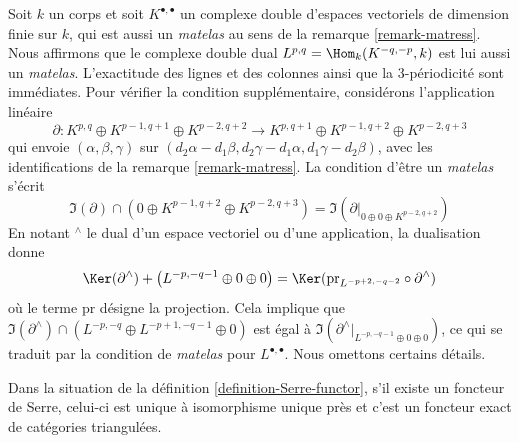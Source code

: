 \begin{remark}
\label{remark-dual-matress}
Soit $k$ un corps et soit $K^{\bullet, \bullet}$ un complexe double
d'espaces vectoriels de dimension finie sur $k$, qui est aussi un {\it matelas} au sens de la
remarque \ref{remark-matress}. Nous affirmons que le complexe double dual
$L^{p, q} = \Hom_k(K^{-q, -p}, k)$ est lui aussi un {\it matelas}. L'exactitude des
lignes et des colonnes ainsi que la 3-périodicité sont immédiates. Pour vérifier
la condition supplémentaire, considérons l'application linéaire
$$
\partial :
K^{p, q} \oplus K^{p - 1, q + 1} \oplus K^{p - 2, q + 2}
\longrightarrow
K^{p, q + 1} \oplus K^{p - 1, q + 2} \oplus K^{p - 2, q + 3}
$$
qui envoie $(\alpha, \beta, \gamma)$ sur
$(d_2 \alpha - d_1 \beta, d_2 \gamma - d_1 \alpha, d_1 \gamma - d_2 \beta)$,
avec les identifications de la remarque \ref{remark-matress}.
La condition d'être un {\it matelas} s'écrit
$$
\Im(\partial) \cap
\left( 0 \oplus K^{p - 1, q + 2} \oplus K^{p - 2, q + 3} \right)
=
\Im(\partial|_{0 \oplus 0 \oplus K^{p - 2, q + 2}})
$$
En notant ${}^\wedge$ le dual d'un espace vectoriel ou d'une application, la dualisation
donne
$$
\Ker(\partial^\wedge) +
\left(L^{-p, -q - 1} \oplus 0 \oplus 0 \right)
=
\Ker(\text{pr}_{L^{-p + 2, -q - 2}} \circ \partial^\wedge)
$$
où le terme $\text{pr}$ désigne la projection. Cela implique
que
$\Im(\partial^\wedge) \cap (L^{-p, -q} \oplus L^{-p + 1, -q - 1} \oplus 0)$
est égal à
$\Im(\partial^\wedge|_{L^{-p, -q - 1} \oplus 0 \oplus 0})$, ce qui
se traduit par la condition de {\it matelas} pour $L^{\bullet, \bullet}$.
Nous omettons certains détails.
\end{remark}

\begin{lemma}
\label{lemma-Serre-functor}
Dans la situation de la définition \ref{definition-Serre-functor},
s'il existe un foncteur de Serre, celui-ci est unique à isomorphisme unique près
et c'est un foncteur exact de catégories triangulées.
\end{lemma}

